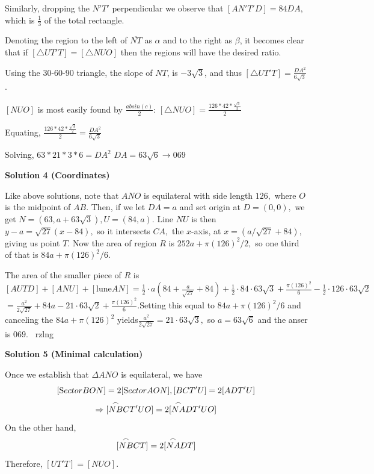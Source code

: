 \begin{enumerate}
 Similarly, dropping the $N'T'$ perpendicular we observe that $[AN'T'D] = 84DA$, which is $\frac{1}{3}$ of the total rectangle.

 Denoting the region to the left of $\overline {NT}$ as $\alpha$ and to the right as $\beta$, it becomes clear that if $[\triangle UT'T] = [\triangle NUO]$ then the regions will have the desired ratio.

 Using the 30-60-90 triangle, the slope of $NT$, is ${-3\sqrt{3}}$, and thus $[\triangle UT'T] = \frac {DA^2}{6\sqrt{3}}$.

 $[NUO]$ is most easily found by $\frac{absin(c)}{2}$: $[\triangle NUO] = \frac {126*42 * \frac {\sqrt{3}}{2}}{2}$

 Equating, $\frac {126*42 * \frac {\sqrt{3}}{2}}{2} = \frac {DA^2}{6\sqrt{3}}$

 Solving, $63 * 21 * 3 * 6 = DA^2$
$DA = 63 \sqrt{6} \longrightarrow \boxed {069}$




\textbf{Solution 4 (Coordinates)}

Like above solutions, note that $ANO$ is equilateral with side length $126,$ where $O$ is the midpoint of $AB.$ Then, if we let $DA=a$ and set origin at $D=(0,0),$ we get $N=(63,a+63\sqrt{3}), U=(84,a).$ Line $NU$ is then $y-a=\sqrt{27}(x-84),$ so it intersects $CA,$ the $x$-axis, at $x=(a/\sqrt{27}+84),$ giving us point $T.$ Now the area of region $R$ is $252a+\pi(126)^2 / 2,$ so one third of that is $84a+\pi(126)^2 / 6.$

 The area of the smaller piece of $R$ is $[AUTD] + [ANU] + [\text{lune} AN] = \frac{1}{2} \cdot a(84+\frac{a}{\sqrt{27}}+84)+\frac{1}{2} \cdot 84 \cdot 63 \sqrt{3}+ \frac{\pi (126)^2}{6}-\frac{1}{2} \cdot 126 \cdot 63 \sqrt{2}$$=\frac{a^2}{2\sqrt{27}}+84a-21\cdot 63\sqrt{2} + \frac{\pi(126)^2}{6}.$Setting this equal to $84a+\pi(126)^2 / 6$ and canceling the $84a + \pi(126)^2$ yields$\frac{a^2}{2\sqrt{27}}=21 \cdot 63 \sqrt{3},$ so $a = 63 \sqrt{6}$ and the anser is $\boxed{069}.$~ rzlng

 



\textbf{Solution 5 (Minimal calculation)}

Once we establish that $\Delta ANO$ is equilateral, we have 
 \[[{\textrm Sector } BON] = 2[{\textrm Sector } AON],  [BCT'U]=2[ADT'U]\]
 \[\Rightarrow [\overset{\large\frown}{NB} CT'UO]=2[\overset{\large\frown}{NA} DT'UO]\]On the other hand,
 \[[\overset{\large\frown}{NB} CT]=2[\overset{\large\frown}{NA} DT]\]Therefore, $[UT'T]=[NUO]$. 


\end{enumerate}
